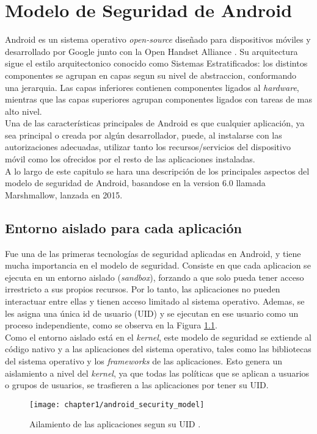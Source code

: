 \chapter{Modelo de Seguridad de Android}
Android \cite{aos} es un sistema operativo \textit{open-source} \cite{aosp} diseñado para dispositivos móviles y
desarrollado por Google junto con la Open Handset Alliance \cite{oha}. Su arquitectura sigue el estilo arquitectonico conocido como Sistemas Estratificados: los distintos componentes se agrupan en capas segun su nivel de abstraccion, conformando una jerarquia. Las capas inferiores contienen componentes ligados al \textit{hardware}, mientras que las capas superiores agrupan componentes ligados con tareas de mas alto nivel.\\
Una de las características principales de Android es que cualquier aplicación, ya sea principal o
creada por algún desarrollador, puede, al instalarse con las autorizaciones adecuadas, utilizar tanto
los recursos/servicios del dispositivo móvil como los ofrecidos por el resto de las aplicaciones
instaladas.\\
A lo largo de este capitulo se hara una descripción de los principales aspectos del modelo de seguridad de Android, basandose en la version 6.0 llamada Marshmallow, lanzada en 2015.
\section{Entorno aislado para cada aplicación}\label{ch01-sandbox}
Fue una de las primeras tecnologías de seguridad aplicadas en Android, y tiene mucha importancia en el modelo de seguridad. Consiste en que cada aplicacion se ejecuta en un entorno aislado (\textit{sandbox}), forzando a que solo pueda tener acceso irrestricto a sus propios recursos. Por lo tanto, las aplicaciones no pueden interactuar entre ellas y tienen acceso limitado al sistema operativo. Ademas, se les asigna una única id de usuario (UID) y se ejecutan en ese usuario como un proceso independiente, como se observa en la Figura \ref{fig:ch01:sandbox}.\\
Como el entorno aislado está en el \textit{kernel}, este modelo de seguridad se extiende al código nativo y a las aplicaciones del sistema operativo, tales como las bibliotecas del sistema operativo y los \textit{frameworks} de las aplicaciones. Esto genera un aislamiento a nivel del \textit{kernel}, ya que todas las políticas que se aplican a usuarios o grupos de usuarios, se trasfieren a las aplicaciones por tener su UID.
\begin{figure}[!hb]
	\begin{center}
		\texttt{[image: chapter1/android\_security\_model]}
	    \caption{Ailamiento de las aplicaciones segun su UID \cite{asreview2015}.}
	    \label{fig:ch01:sandbox}
    \end{center}
\end{figure}
